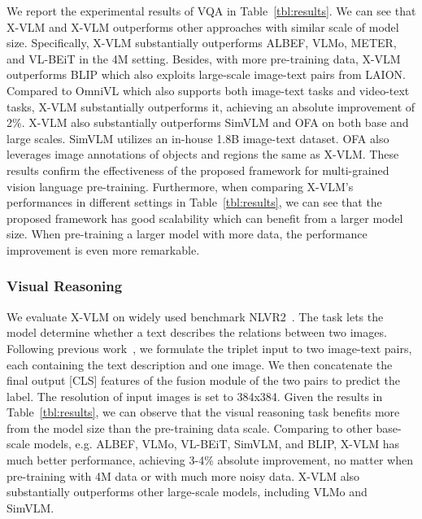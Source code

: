 \documentclass{article}
\newcommand{\baby}{X-VLM\xspace}
\newcommand{\babyB}{X-VLM\xspace}
\newcommand{\babyL}{X-VLM\xspace}
\begin{document}
  
We report the experimental results of VQA in Table~\ref{tbl:results}. We can see that \babyB and \babyL outperforms other approaches with similar scale of model size. Specifically, \babyB substantially outperforms ALBEF, VLMo, METER, and VL-BEiT in the 4M setting. Besides, with more pre-training data, \babyB outperforms BLIP which also exploits large-scale image-text pairs from LAION. Compared to OmniVL which also supports both image-text tasks and video-text tasks, \babyB substantially outperforms it, achieving an absolute improvement of 2\%. \baby also substantially outperforms SimVLM and OFA on both base and large scales. SimVLM utilizes an in-house 1.8B image-text dataset. OFA also leverages image annotations of objects and regions the same as \baby. These results confirm the effectiveness of the proposed framework for multi-grained vision language pre-training. Furthermore, when comparing \baby's performances in different settings in Table~\ref{tbl:results}, we can see that the proposed framework has good scalability which can benefit from a larger model size. When pre-training a larger model with more data, the performance improvement is even more remarkable. 


\subsubsection{Visual Reasoning}
We evaluate \baby on widely used benchmark NLVR2~\cite{suhr2018corpus}. The task lets the model determine whether a text describes the relations between two images. Following previous work~\cite{wang2021vlmo, bao2022vl}, we formulate the triplet input to two image-text pairs, each containing the text description and one image. We then concatenate the final output [CLS] features of the fusion module of the two pairs to predict the label. The resolution of input images is set to 384x384. Given the results in Table~\ref{tbl:results}, we can observe that the visual reasoning task benefits more from the model size than the pre-training data scale. Comparing to other base-scale models, e.g. ALBEF, VLMo, VL-BEiT, SimVLM, and BLIP, \babyB has much better performance, achieving  3-4\% absolute improvement, no matter when pre-training with 4M data or with much more noisy data. \babyL also substantially outperforms other large-scale models, including VLMo and SimVLM. 
\end{document}
